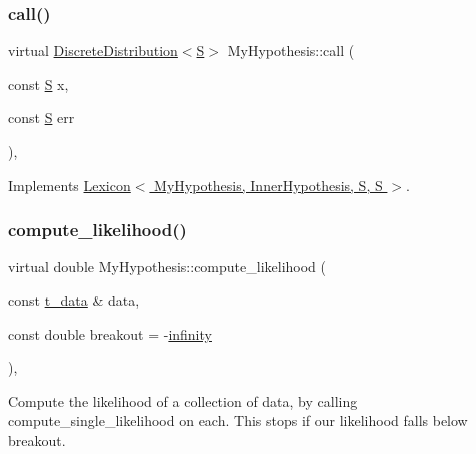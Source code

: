 \subsubsection{\texorpdfstring{call()}{call()}}
{\footnotesize\ttfamily virtual \hyperlink{class_discrete_distribution}{Discrete\+Distribution}$<$\hyperlink{_formal_language_theory-_complex_2_main_8cpp_a51c40915539205f0b5add30b0d68a4cb}{S}$>$ My\+Hypothesis\+::call (\begin{DoxyParamCaption}\item[{const \hyperlink{_formal_language_theory-_complex_2_main_8cpp_a51c40915539205f0b5add30b0d68a4cb}{S}}]{x,  }\item[{const \hyperlink{_formal_language_theory-_complex_2_main_8cpp_a51c40915539205f0b5add30b0d68a4cb}{S}}]{err }\end{DoxyParamCaption})\hspace{0.3cm}{\ttfamily [inline]}, {\ttfamily [virtual]}}



Implements \hyperlink{class_lexicon_aaaff682145f9cb15f7252420fe76f111}{Lexicon$<$ My\+Hypothesis, Inner\+Hypothesis, S, S $>$}.

\mbox{\label{class_my_hypothesis_a85348639689176eaf456aaadd63cef2f}} 
\subsubsection{\texorpdfstring{compute\+\_\+likelihood()}{compute\_likelihood()}\hspace{0.1cm}{\footnotesize\ttfamily [1/2]}}
{\footnotesize\ttfamily virtual double My\+Hypothesis\+::compute\+\_\+likelihood (\begin{DoxyParamCaption}\item[{const \hyperlink{class_bayesable_a70a593a67c7d43239ecc06bb4fd06a6b}{t\+\_\+data} \&}]{data,  }\item[{const double}]{breakout = {\ttfamily -\/\hyperlink{_numerics_8h_a1bb1e42ae1b40cad6e99da0aab8a5576}{infinity}} }\end{DoxyParamCaption})\hspace{0.3cm}{\ttfamily [inline]}, {\ttfamily [virtual]}}



Compute the likelihood of a collection of data, by calling compute\+\_\+single\+\_\+likelihood on each. This stops if our likelihood falls below breakout. 


